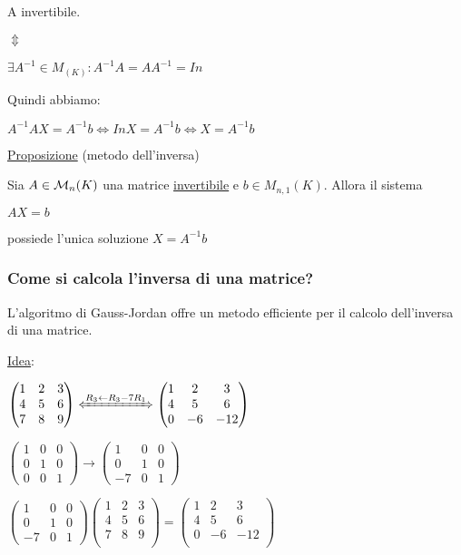 \documentclass{article}
\begin{document}
A invertibile.

$\Updownarrow$

$\exists A^{-1}\in M_(K): A^{-1}A=AA^{-1}=In$

Quindi abbiamo:

$A^{-1}AX=A^{-1}b\Leftrightarrow InX=A^{-1}b\Leftrightarrow X=A^{-1}b$

\ul{Proposizione} (metodo dell'inversa)

Sia $A\in \mathcal{M}_n(K)$ una matrice \ul{invertibile} e $b\in M_{n,1}(K)$. Allora il sistema

$AX=b$

possiede l'unica soluzione $X=A^{-1}b$

\subsubsection*{Come si calcola l'inversa di una matrice?}

L'algoritmo di Gauss-Jordan offre un metodo efficiente per il calcolo dell'inversa di una matrice.

\ul{Idea}:

$\begin{pmatrix}
  1&2&3\\
  4&5&6\\
  7&8&9\\
\end{pmatrix}\xLeftrightarrow{R_3\leftarrow R_3-7R_1}
\begin{pmatrix}
  1&2&3\\
  4&5&6\\
  0&-6&-12\\
\end{pmatrix}$

$\begin{pmatrix}
  1&0&0\\
  0&1&0\\
  0&0&1
\end{pmatrix}\rightarrow
\begin{pmatrix}
  1&0&0\\
  0&1&0\\
  -7&0&1
\end{pmatrix}$

$\begin{pmatrix}
  1&0&0\\
  0&1&0\\
  -7&0&1
\end{pmatrix}
\begin{pmatrix}
  1&2&3\\
  4&5&6\\
  7&8&9\\
\end{pmatrix}=
\begin{pmatrix}
  1&2&3\\
  4&5&6\\
  0&-6&-12\\
\end{pmatrix}$
\end{document}

